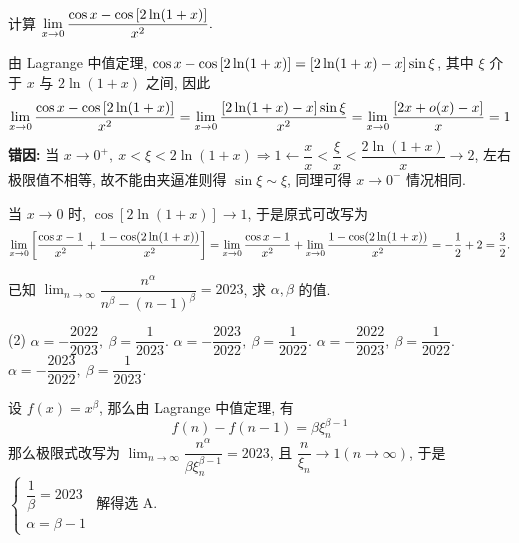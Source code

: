 \begin{example}
    计算 $\displaystyle\lim_{x\to0}\dfrac{\cos x-\cos\qty[2\ln(1+x)]}{x^2}.$
\end{example}
\begin{errorSolution}
    由 Lagrange 中值定理, $\cos x-\cos\qty[2\ln(1+x)]=\qty[2\ln(1+x)-x]\sin\xi$, 其中 $\xi$ 介于 $x$ 与 $2\ln(1+x)$ 之间, 因此
    $$\lim_{x\to0}\dfrac{\cos x-\cos\qty[2\ln(1+x)]}{x^2}=\lim_{x\to0}\dfrac{\qty[2\ln(1+x)-x]\sin\xi}{x^2}=\lim_{x\to0}\dfrac{\qty[2x+o(x)-x]}{x}=1$$
    \textbf{错因: }当 $x\to0^+,~x<\xi<2\ln(1+x)\Rightarrow 1\gets\dfrac{x}{x}<\dfrac{\xi}{x}<\dfrac{2\ln(1+x)}{x}\to 2$, 左右极限值不相等, 故不能由夹逼准则得 $\sin\xi\sim\xi$, 同理可得 $x\to0^-$ 情况相同.\\
\end{errorSolution}
\begin{solution}
    当 $x\to0$ 时, $\cos [2\ln(1+x)]\to1$, 于是原式可改写为 $$\lim_{x\to0}\qty[\dfrac{\cos x-1}{x^2}+\dfrac{1-\cos(2\ln(1+x))}{x^2}]=\lim_{x\to0}\dfrac{\cos x-1}{x^2}+\lim_{x\to0}\dfrac{1-\cos(2\ln(1+x))}{x^2}=-\dfrac{1}{2}+2=\dfrac{3}{2}.$$
\end{solution}

\begin{example}
    已知 $\displaystyle\lim_{n\to\infty}\dfrac{n^{\alpha}}{n^\beta-(n-1)^\beta}=2023$, 求 $\alpha,\beta$ 的值.
    \begin{tasks}(2)
        \task $\alpha=-\dfrac{2022}{2023},~\beta=\dfrac{1}{2023}.$
        \task $\alpha=-\dfrac{2023}{2022},~\beta=\dfrac{1}{2022}.$
        \task $\alpha=-\dfrac{2022}{2023},~\beta=\dfrac{1}{2022}.$
        \task $\alpha=-\dfrac{2023}{2022},~\beta=\dfrac{1}{2023}.$
    \end{tasks}
\end{example}
\begin{solution}
    设 $f(x)=x^\beta$, 那么由 Lagrange 中值定理, 有 $$f(n)-f(n-1)=\beta\xi_n^{\beta-1}$$
    那么极限式改写为 $\displaystyle\lim_{n\to\infty}\dfrac{n^\alpha}{\beta \xi_n^{\beta-1}}=2023$,
    且 $\dfrac{n}{\xi_n}\to1(n\to\infty)$, 于是 $\begin{cases}
            \dfrac{1}{\beta}=2023 \\\alpha=\beta-1
        \end{cases}$ 解得选 A.
\end{solution}

